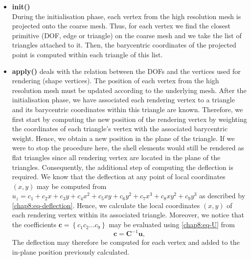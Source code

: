 \begin{itemize}
\item \textbf{init()} \\
During the initialisation phase, each vertex from the high resolution mesh is projected onto the coarse mesh. Thus, for each vertex we find the closest primitive (DOF, edge or triangle) on the coarse mesh and we take the list of triangles attached to it. Then, the barycentric coordinates of the projected point is computed within each triangle of this list.
%
\item \textbf{apply()} deals with the relation between the DOFs and the vertices used for rendering (shape vertices). The position of each vertex from the high resolution mesh must be updated according to the underlying mesh. After the initialisation phase, we have associated each rendering vertex to a triangle and its barycentric coordinates within this triangle are known. Therefore, we first start by computing the new position of the rendering vertex by weighting the coordinates of each triangle's vertex with the associated barycentric weight. Hence, we obtain a new position in the plane of the triangle. If we were to stop the procedure here, the shell elements would still be rendered as flat triangles since all rendering vertex are located in the plane of the triangles. Consequently, the additional step of computing the deflection is required. We know that the deflection at any point of local coordinates $(x, y)$ may be computed from $u_z = c_1 + c_2x + c_3y + c_4x^2 + c_5xy + c_6y^2 + c_7x^3 + c_8xy^2 + c_9y^3$ as described by \eqref{chap8:eq-deflection}. Hence, we calculate the local coordinates $(x, y)$ of each rendering vertex within its associated triangle. Moreover, we notice that the coefficients $ \mathbf{c} = \left\{c_1 c_2 \ldots c_9 \right\} $ may be evaluated using \eqref{chap8:eq-U} from
\begin{equation}
\mathbf{c} = \mathbf{C}^{-1} \mathbf{u},
\end{equation}
The deflection may therefore be computed for each vertex and added to the in-plane position previously calculated. 
\end{itemize}

